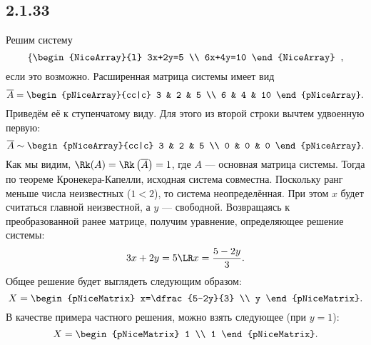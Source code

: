 \subsection{2.1.33}

Решим систему
\[
\left\{
\begin{NiceArray}{l}
	3x+2y=5 \\
	6x+4y=10
\end{NiceArray}
\right.\;,
\]
если это возможно. Расширенная матрица системы имеет вид
\[
\overline{A}=
\begin{pNiceArray}{cc|c}
	3 & 2 & 5 \\
	6 & 4 & 10
\end{pNiceArray}.
\]
Приведём её к ступенчатому виду. Для этого из второй строки вычтем удвоенную первую:
\[
\overline{A}\sim
\begin{pNiceArray}{cc|c}
	3 & 2 & 5 \\
	0 & 0 & 0
\end{pNiceArray}.
\]
Как мы видим, $\Rk(A)=\Rk\left(\overline{A}\right)=1$, где $A$ --- основная матрица системы. Тогда по теореме Кронекера-Капелли, исходная система совместна. Поскольку ранг меньше числа неизвестных ($1<2$), то система неопределённая. При этом $x$ будет считаться главной неизвестной, а $y$ --- свободной. Возвращаясь к преобразованной ранее матрице, получим уравнение, определяющее решение системы:
\[
3x+2y=5\LR x=\frac{5-2y}{3}.
\]
Общее решение будет выглядеть следующим образом:
\[
X=
\begin{pNiceMatrix}
	x=\dfrac{5-2y}{3} \\
	y
\end{pNiceMatrix}.
\]
В качестве примера частного решения, можно взять следующее (при $y=1$):
\[
X=
\begin{pNiceMatrix}
	1 \\
	1
\end{pNiceMatrix}.
\]